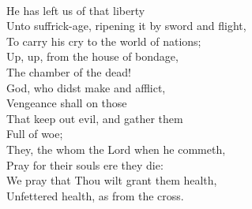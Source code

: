 \documentclass[smalldemyvopaper,11pt,twoside,onecolumn,openright,extrafontsizes]{memoir}
\begin{document}
\\He has left us of that liberty
\\Unto suffrick-age, ripening it by sword and flight,
\\To carry his cry to the world of nations;
\\Up, up, from the house of bondage,
\\The chamber of the dead!
\\God, who didst make and afflict,
\\Vengeance shall on those
\\That keep out evil, and gather them
\\Full of woe;
\\They, the whom the Lord when he commeth,
\\Pray for their souls ere they die:
\\We pray that Thou wilt grant them health,
\\Unfettered health, as from the cross.
\end{document}
